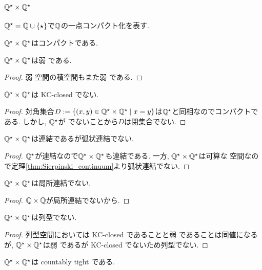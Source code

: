 \documentclass[uplatex, dvipdfmx, a4paper, 12pt, class=jsbook, crop=false]{standalone}
\begin{document}
\section{\texorpdfstring{$ \mathbb{Q}^\star \times \mathbb{Q}^\star $}{Q\^{*} × Q\^{*}}}
\label{ex:double-Q-star}

$ \mathbb{Q}^\star = \mathbb{Q} \cup \{\star\} $で$ \mathbb{Q} $の一点コンパクト化を表す.

\begin{property}
	$ \mathbb{Q}^\star \times \mathbb{Q}^\star $はコンパクトである.
\end{property}

\begin{property}
	\label{property:Product of Q^star is weakly Hausdorff}
	$ \mathbb{Q}^\star \times \mathbb{Q}^\star $は弱 \Hausdorff である.
\end{property}
\begin{proof}
	弱 \Hausdorff 空間の積空間もまた弱 \Hausdorff である.
\end{proof}

\begin{property}
	\label{property:Product of Q^star is not KC-closed}
	$ \mathbb{Q}^\star \times \mathbb{Q}^\star $は KC-closed でない.
\end{property}
\begin{proof}
	対角集合$ D \defeq \setcomp{(x, y) \in \Q^\star \times \Q^\star}{x = y} $は$ \mathbb{Q}^\star $と同相なのでコンパクトである. しかし, $ \mathbb{Q}^\star $が \Hausdorff でないことから$ D $は閉集合でない.
\end{proof}

\begin{property}
	$ \mathbb{Q}^\star \times \mathbb{Q}^\star $は連結であるが弧状連結でない.
\end{property}
\begin{proof}
	$ \mathbb{Q}^\star $が連結なので$ \mathbb{Q}^\star \times \mathbb{Q}^\star $も連結である. 一方, $ \mathbb{Q}^\star \times \mathbb{Q}^\star $は可算な  空間なので定理\ref{thm:Sierpinski_continuum}より弧状連結でない.
\end{proof}

\begin{property}
	$ \mathbb{Q}^\star \times \mathbb{Q}^\star $は局所連結でない.
\end{property}
\begin{proof}
	$ \mathbb{Q} \times \mathbb{Q} $が局所連結でないから.
\end{proof}

\begin{property}
	$ \mathbb{Q}^\star \times \mathbb{Q}^\star $は列型でない.
\end{property}
\begin{proof}
	列型空間においては KC-closed であることと弱 \Hausdorff であることは同値になるが, $ \mathbb{Q}^\star \times \mathbb{Q}^\star $は弱 \Hausdorff であるが KC-closed でないため列型でない.
\end{proof}

\begin{property}
	$ \mathbb{Q}^\star \times \mathbb{Q}^\star $は countably tight である.
\end{property}
\end{document}
